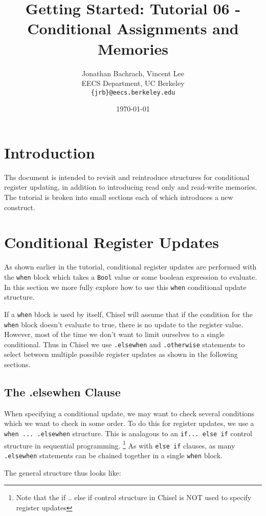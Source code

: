 \documentclass[twocolumn, 10pt]{article}
\title{Getting Started: Tutorial 06 - Conditional Assignments and Memories}
\author{Jonathan Bachrach, Vincent Lee \\
EECS Department, UC Berkeley\\
{\tt  \{jrb\}@eecs.berkeley.edu}
}
\date{\today}
\begin{document}
\maketitle{}

\section{Introduction}

Ths document is intended to revisit and reintroduce structures for conditional register updating, in addition to introducing read only and read-write memories. The tutorial is broken into small sections each of which introduces a new construct.

\section{Conditional Register Updates}

As shown earlier in the tutorial, conditional register updates are performed with the \verb+when+ block which takes a \verb+Bool+ value or some boolean expression to evaluate.
In this section we more fully explore how to use this \verb+when+ conditional update structure.

If a \verb+when+ block is used by itself, Chisel will assume that if the condition for the \verb+when+ block doesn't evaluate to true, there is no update to the register value. However, most of the time we don't want to limit ourselves to a single conditional. Thus in Chisel we use \verb+.elsewhen+ and \verb+.otherwise+ statements to select between multiple possible register updates as shown in the following sections.

\subsection{The .elsewhen Clause}

When specifying a conditional update, we may want to check several conditions which we want to check in some order. 
To do this for register updates, we use a \verb+when ... .elsewhen+ structure. This is analagous to an \verb+if... else if+ control structure in sequential programming. \footnote{Note that the if .. else if control structure in Chisel is NOT used to specify register updates} 
As with \verb+else if+ clauses, as many \verb+.elsewhen+ statements can be chained together in a single \verb+when+ block. 

The general structure thus looks like:
\end{document}
